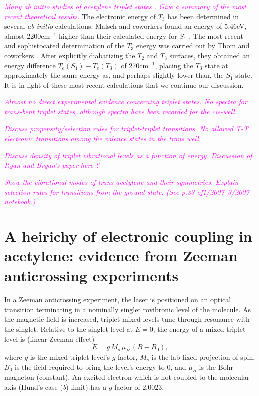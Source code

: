 \documentclass[12pt]{mitthesis}
\newcommand{\POINT}[1]{\textcolor{magenta}{\emph{#1}}}
\begin{document}
\POINT{Many ab initio studies of acetylene triplet states
  \cite{demoulin75, lischka86, cui96, cui97, malsch98, dallos02,
    ventura03, thom07}.  Give a summary of the most recent theoretical
  results.}  The electronic energy of $T_3$ has been determined in
several \emph{ab initio} calculations.  Malsch and coworkers found an
energy of 5.46eV, almost 2200cm$^{-1}$ higher than their calculated
energy for $S_1$ \cite{malsch98}.  The most recent and sophistocated
determination of the $T_3$ energy was carried out by Thom and
coworkers \cite{thom07}.  After explicitly diabatizing the $T_2$ and
$T_3$ surfaces, they obtained an energy difference $T_e(S_1)-T_e(T_3)$
of 270cm$^{-1}$, placing the $T_3$ state at approximately the same
energy as, and perhaps slightly lower than, the $S_1$ state.  It is in
light of these most recent calculations that we continue our
discussion.

\POINT{Almost no direct experimental evidence concerning triplet
  states.  No spectra for trans-bent triplet states, although spectra
  have been recorded for the cis-well.}

\POINT{Discuss propensity/selection rules for triplet-triplet
  transitions.  No allowed T-T electronic transitions among the
  valence states in the trans well.}

\POINT{Discuss density of triplet vibrational levels as a function of
  energy.  Discussion of Ryan and Bryan's paper here \cite{thom07}?}

\POINT{Show the vibrational modes of \emph{trans} acetylene and their
  symmetries.  Explain selection rules for transitions from the ground
  state.  (See p.33 of1/2007--3/2007 notebook.)}


\section{A heirichy of electronic coupling in acetylene: evidence from
  Zeeman anticrossing experiments}

In a Zeeman anticrossing experiment, the laser is positioned on an
optical transition terminating in a nominally singlet rovibronic level
of the molecule.  As the magnetic field is increased, triplet-mixed
levels tune through resonance with the singlet.  Relative to the
singlet level at $E=0$, the energy of a mixed triplet level is (linear
Zeeman effect)
\begin{equation}
E = g \, M_s \, \mu_B \, (B-B_0),
\end{equation}
where $g$ is the mixed-triplet level's $g$-factor, $M_s$ is the
lab-fixed projection of spin, $B_0$ is the field required to bring the
level's energy to 0, and $\mu_B$ is the Bohr magneton (constant).  An
excited electron which is not coupled to the molecular axis (Hund's
case (\emph{b}) limit) has a $g$-factor of $2.0023$.
\end{document}
